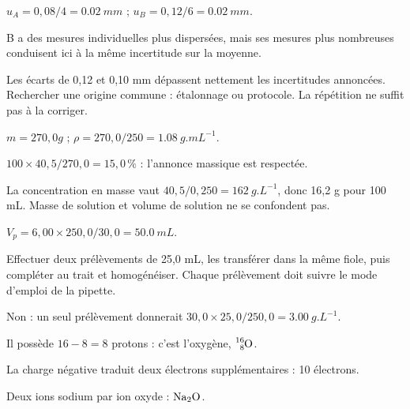 \begin{questions}
\item $u_A=0,08/4=\qty{0,02}{mm}$ ; $u_B=0,12/6=\qty{0,02}{mm}$.
\item B a des mesures individuelles plus dispersées, mais ses mesures plus nombreuses conduisent ici à la même incertitude sur la moyenne.
\item Les écarts de 0,12 et 0,10 mm dépassent nettement les incertitudes annoncées. Rechercher une origine commune : étalonnage ou protocole. La répétition ne suffit pas à la corriger.
\end{questions}

\begin{questions}
\item $m=270,0\unit{g}$ ; $\rho=270,0/250=\qty{1,08}{g.mL^{-1}}$.
\item $100\times40,5/270,0=15,0\,\%$ : l’annonce massique est respectée.
\item La concentration en masse vaut $40,5/0,250=\qty{162}{g.L^{-1}}$, donc 16,2 g pour 100 mL. Masse de solution et volume de solution ne se confondent pas.
\end{questions}

\begin{questions}
\item $V_p=6,00\times250,0/30,0=\qty{50,0}{mL}$.
\item Effectuer deux prélèvements de 25,0 mL, les transférer dans la même fiole, puis compléter au trait et homogénéiser. Chaque prélèvement doit suivre le mode d’emploi de la pipette.
\item Non : un seul prélèvement donnerait $30,0\times25,0/250,0=\qty{3,00}{g.L^{-1}}$.
\end{questions}

\begin{questions}
\item Il possède $16-8=8$ protons : c’est l’oxygène, $\ce{^{16}_{8}O}$.
\item La charge négative traduit deux électrons supplémentaires : 10 électrons.
\item Deux ions sodium par ion oxyde : $\ce{Na2O}$.
\end{questions}


